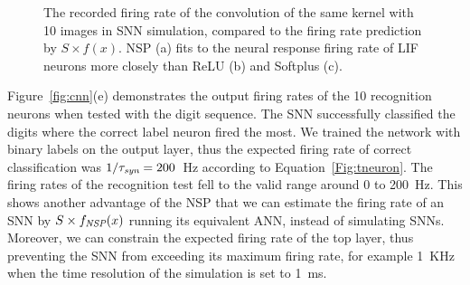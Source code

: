 \begin{figure}[tbh!]
\begin{subfigure}[t]{0.6\textwidth}
		\end{subfigure}
		\caption[The recorded firing rate of the convolution outcomes.]{
			The recorded firing rate of the convolution of the same kernel with 10 images in SNN simulation, compared to the firing rate prediction by $S \times f(x)$.
			NSP (a) fits to the neural response firing rate of LIF neurons more closely than ReLU (b) and Softplus (c).}
		\label{fig:af_compare}
	\end{figure}
	
	Figure~\ref{fig:cnn}(e) demonstrates the output firing rates of the 10 recognition neurons when tested with the digit sequence.
	The SNN successfully classified the digits where the correct label neuron fired the most.
	We trained the network with binary labels on the output layer, thus the expected firing rate of correct classification was $1/\tau_{\textit{\textrm{syn}}}=200$~Hz according to Equation~\ref{Fig:tneuron}.
	The firing rates of the recognition test fell to the valid range around 0 to 200~Hz.
	This shows another advantage of the NSP that we can estimate the firing rate of an SNN by $S \times f_{\textit{\textrm{NSP}}}(x)$ running its equivalent ANN, instead of simulating SNNs.
	Moreover, we can constrain the expected firing rate of the top layer, thus preventing the SNN from exceeding its maximum firing rate, for example 1~KHz when the time resolution of the simulation is set to 1~ms.
	
